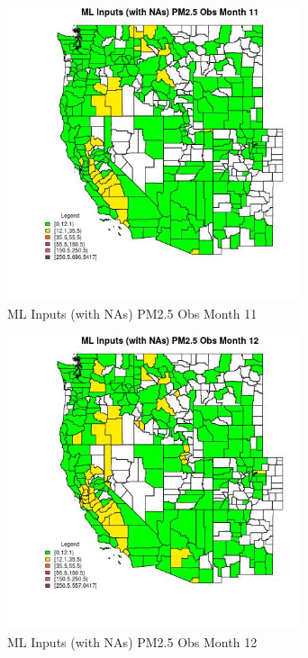 \clearpage 

\begin{figure} 
\centering  
\includegraphics[width=0.77\textwidth]{Code_Outputs/Report_ML_input_PM25_Step4_part_e_de_duplicated_aves_compiled_2019-05-20wNAs_CountyPM25_ObsmedianMonth11.jpg} 
\caption{\label{fig:Report_ML_input_PM25_Step4_part_e_de_duplicated_aves_compiled_2019-05-20wNAsCountyPM25_ObsmedianMonth11}ML Inputs (with NAs) PM2.5 Obs Month 11} 
\end{figure} 
 

\begin{figure} 
\centering  
\includegraphics[width=0.77\textwidth]{Code_Outputs/Report_ML_input_PM25_Step4_part_e_de_duplicated_aves_compiled_2019-05-20wNAs_CountyPM25_ObsmedianMonth12.jpg} 
\caption{\label{fig:Report_ML_input_PM25_Step4_part_e_de_duplicated_aves_compiled_2019-05-20wNAsCountyPM25_ObsmedianMonth12}ML Inputs (with NAs) PM2.5 Obs Month 12} 
\end{figure} 
 
